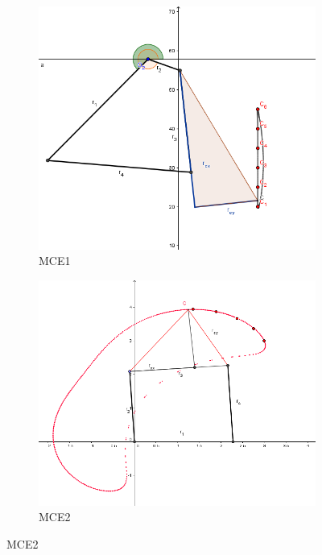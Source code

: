 \begin{figure}
	\centering
	\begin{subfigure}[b]{0.49\linewidth}
		\includegraphics[width=\linewidth]{Figures/MCE1}
		\caption{MCE1} \label{fig:M1} 
	\end{subfigure}\hfill
	\begin{subfigure}[b]{0.49\linewidth}
		\includegraphics[width=\textwidth]{Figures/MCE2}
		\caption{MCE2} \label{fig:M2} 
	\end{subfigure}
\hfill
\hfill

\end{figure}
